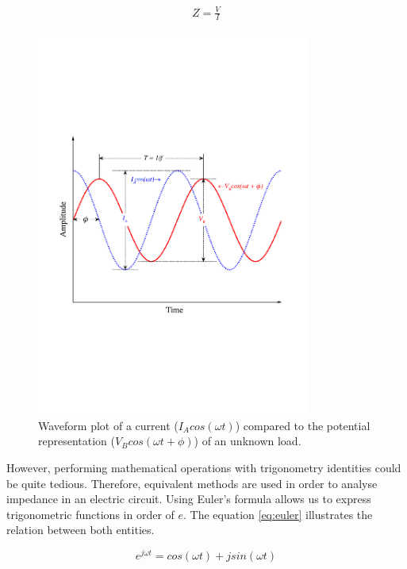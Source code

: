 \begin{align}
	\label{eq:ohm}
	Z = \frac{V}{I}
\end{align}

\begin{figure}[!htpb]
	\centering
	\includegraphics[width=0.8\textwidth,keepaspectratio, trim={0cm 0cm 0cm 0cm},clip]{figure_1}    
	\caption[Impedance waveforms]{Waveform plot of a current ($I_A cos (\omega t)$) compared to the potential representation ($V_B cos (\omega t + \phi)$) of an unknown load.}
	\label{fig:impedance wave}
\end{figure}


However, performing mathematical operations with trigonometry identities could be quite tedious. Therefore, equivalent methods are used in order to analyse impedance in an electric circuit. Using Euler's formula allows us to express trigonometric functions in order of $e$. The equation \ref{eq:euler} illustrates the relation between both entities.

\begin{equation}
\label{eq:euler}
e^{j\omega t} = cos(\omega t) + j sin(\omega t)
\end{equation}  

